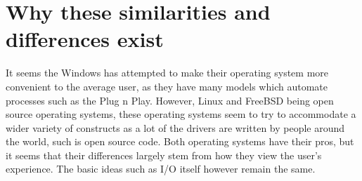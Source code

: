 \documentclass[onecolumn, draftclsnofoot,10pt, compsoc]{IEEEtran}
\begin{document}
\section{Why these similarities and differences exist}

It seems the Windows has attempted to make their operating system more convenient to the average user, as they have many models which automate processes such as the Plug n Play. However, Linux and FreeBSD being open source operating systems, these operating systems seem to try to accommodate a wider variety of constructs as a lot of the drivers are written by people around the world, such is open source code. Both operating systems have their pros, but it seems that their differences largely stem from how they view the user’s experience. The basic ideas such as I/O itself however remain the same. 
\end{document}
